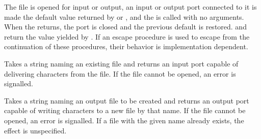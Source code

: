 \begin{entry}{%
}

 The file is opened for input or output, an input or output port
connected to it is made the default value returned by
 or , and the
 is called with no arguments.  When the  returns,
the port is closed and the previous default is restored.
 and  return the
value yielded by .
If an escape procedure
is used to escape from the continuation of these procedures, their
behavior is implementation dependent.




\end{entry}


\begin{entry}{%
}
 
Takes a string naming an existing file and returns an input port capable of
delivering characters from the file.  If the file cannot be opened, an error is
signalled.

\end{entry}


\begin{entry}{%
}

Takes a string naming an output file to be created and returns an output
port capable of writing characters to a new file by that name.  If the file
cannot be opened, an error is signalled.  If a file with the given name
already exists, the effect is unspecified.

\end{entry}


